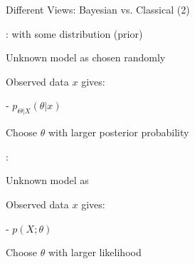 \begin{frame}{Different Views: Bayesian vs. Classical (2)}

{


\plitemsep 0.08in
\bci
\item<2-> :  with some distribution (prior)
\item<3-> Unknown model as chosen randomly 
\item<4-> Observed data $x$ gives:

  -  $p_{\Theta | X}(\theta | x)$
\item<5-> Choose $\theta$ with larger posterior probability 
\eci
}
{

\plitemsep 0.08in
\bci
\item<2-> : 

  \mbox{}
\item<3-> Unknown model as 
\item<4-> Observed data $x$ gives:

  -  $p(X;\theta)$
\item<5-> Choose $\theta$ with larger likelihood\\ 
\eci
}



\end{frame}

